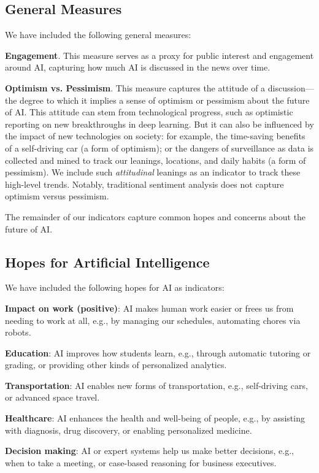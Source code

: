 \documentclass[letterpaper]{article}
\begin{document}
\subsection{General Measures}
We have included the following general measures:

\textbf{Engagement}. This measure serves as a proxy for public interest and engagement around AI, capturing how much AI is discussed in the news over time.

\textbf{Optimism vs. Pessimism}. This measure captures the attitude of a discussion---the degree to which it implies a sense of optimism or pessimism about the future of AI. This attitude can stem from technological progress, such as optimistic reporting on new breakthroughs in deep learning. But it can also be influenced by the impact of new technologies on society: for example, the time-saving benefits of a self-driving car (a form of optimism); or the dangers of surveillance as data is collected and mined to track our leanings, locations, and daily habits (a form of pessimism). We include such \textit{attitudinal} leanings as an indicator to track these high-level trends. Notably, traditional sentiment analysis does not capture optimism versus pessimism.

The remainder of our indicators capture common hopes and concerns about the future of AI.

\subsection{Hopes for Artificial Intelligence}

We have included the following hopes for AI as indicators:

\textbf{Impact on work (positive)}: AI makes human work easier or frees us from needing to work at all, e.g., by managing our schedules, automating chores via robots.

\textbf{Education}: AI improves how students learn, e.g., through automatic tutoring or grading, or providing other kinds of personalized analytics.

\textbf{Transportation}: AI enables new forms of transportation, e.g., self-driving cars, or advanced space travel.

\textbf{Healthcare}: AI enhances the health and well-being of people, e.g., by assisting with diagnosis, drug discovery, or enabling personalized medicine.

\textbf{Decision making}: AI or expert systems help us make better decisions, e.g., when to take a meeting, or case-based reasoning for business executives.
\end{document}
